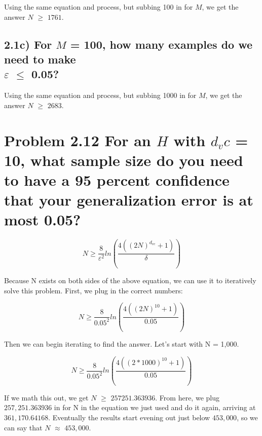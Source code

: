 \documentclass[11pt]{article}
\begin{document}
Using the same equation and process, but subbing 100 in for $M$, we get the answer $N$ $\geq$ $1761$.

\subsection*{2.1c)  For $M$ = 100, how many examples do we need to make \\ $\varepsilon$ $\leq$ 0.05?}

Using the same equation and process, but subbing 1000 in for $M$, we get the answer $N$ $\geq$ $2683$.

\section*{Problem 2.12  For an $H$ with $d_vc$ = 10, what sample size do you need to have a 95 percent confidence that your  generalization error is at most 0.05?}
\begin{equation*}
N \geq \frac{8}{\varepsilon^2} ln (\frac{4((2N)^{d_{vc}} + 1)}{\delta})
\end{equation*}

Because N exists on both sides of the above equation, we can use it to iteratively solve this problem. First, we plug in the correct numbers:

\begin{equation*}
N \geq \frac{8}{0.05^2} ln (\frac{4((2N)^{10} + 1)}{0.05})
\end{equation*}

Then we can begin iterating to find the answer. Let's start with N = 1,000.

\begin{equation*}
N \geq \frac{8}{0.05^2} ln (\frac{4((2 * 1000)^{10} + 1)}{0.05})
\end{equation*}

If we math this out, we get $N$ $\geq$ $257251.363936$. From here, we plug $257,251.363936$ in for N in the equation we just used and do it again, arriving at $361,170.64168$. Eventually the results start evening out just below $453,000$, so we can say that $N$ $\approx$ $453,000$.
\end{document}
